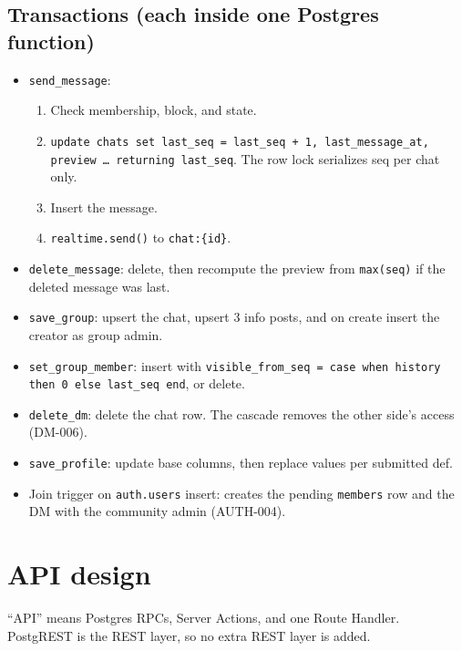 \documentclass[11pt,a4paper]{article}
\newcommand{\code}[1]{\texttt{\small #1}}
\begin{document}
\subsection{Transactions (each inside one Postgres function)}
\begin{itemize}
  \item \code{send\_message}:
        \begin{enumerate}
          \item Check membership, block, and state.
          \item \code{update chats set last\_seq = last\_seq + 1, last\_message\_at, preview \ldots\ returning last\_seq}.
                The row lock serializes seq per chat only.
          \item Insert the message.
          \item \code{realtime.send()} to \code{chat:\{id\}}.
        \end{enumerate}
  \item \code{delete\_message}: delete, then recompute the preview from \code{max(seq)} if the deleted message was last.
  \item \code{save\_group}: upsert the chat, upsert 3 info posts, and on create insert the creator as group admin.
  \item \code{set\_group\_member}: insert with \code{visible\_from\_seq = case when history then 0 else last\_seq end},
        or delete.
  \item \code{delete\_dm}: delete the chat row. The cascade removes the other side's access (DM-006).
  \item \code{save\_profile}: update base columns, then replace values per submitted def.
  \item Join trigger on \code{auth.users} insert: creates the pending \code{members} row and the DM with the
        community admin (AUTH-004).
\end{itemize}

\section{API design}\label{sec:api}
``API'' means Postgres RPCs, Server Actions, and one Route Handler. PostgREST is the REST layer, so no extra
REST layer is added.
\end{document}

